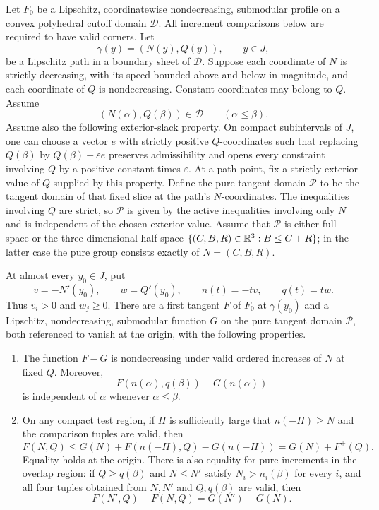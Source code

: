 \begin{lemma}\label{ent:signed-envelope}
Let $F_0$ be a Lipschitz, coordinatewise nondecreasing, submodular
profile on a convex polyhedral cutoff domain $\mathcal D$.  All
increment comparisons below are required to have valid corners.
Let
\[
\gamma(y)=(N(y),Q(y)),\qquad y\in J,
\]
be a Lipschitz path in a boundary sheet of $\mathcal D$.  Suppose
each coordinate of $N$ is strictly decreasing, with its speed
bounded above and below in magnitude, and each coordinate of $Q$
is nondecreasing.  Constant coordinates may belong to $Q$.
Assume
\[
(N(\alpha),Q(\beta))\in\mathcal D\qquad(\alpha\leq\beta).
\]
Assume also the following exterior-slack property.  On compact
subintervals of $J$, one can choose a vector $e$ with strictly
positive $Q$-coordinates such that replacing $Q(\beta)$ by
$Q(\beta)+\varepsilon e$ preserves admissibility and opens every
constraint involving $Q$ by a positive constant times
$\varepsilon$.  At a path point, fix a strictly exterior value
of $Q$ supplied by this property.  Define the pure tangent
domain $\mathcal P$ to be the tangent domain of that fixed
slice at the path's $N$-coordinates.  The inequalities involving
$Q$ are strict, so $\mathcal P$ is given by the active
inequalities involving only $N$ and is independent of the chosen
exterior value.  Assume that $\mathcal P$ is either full space or
the three-dimensional half-space
$\{(C,B,R)\in\mathbb R^3:B\leq C+R\}$; in the latter case the pure
group consists exactly of $N=(C,B,R)$.

At almost every $y_0\in J$, put
\[
v=-N'(y_0),\qquad w=Q'(y_0),\qquad
n(t)=-tv,\qquad q(t)=tw.
\]
Thus $v_i>0$ and $w_j\geq0$.  There are a first tangent $F$ of
$F_0$ at $\gamma(y_0)$ and a Lipschitz, nondecreasing,
submodular function $G$ on the pure tangent domain $\mathcal P$,
both referenced to vanish at the origin, with the following
properties.
\begin{enumerate}[label=\textup{(\roman*)}]
\item
The function $F-G$ is nondecreasing under valid ordered increases
of $N$ at fixed $Q$.  Moreover,
\[
F(n(\alpha),q(\beta))-G(n(\alpha))
\]
is independent of $\alpha$ whenever $\alpha\leq\beta$.

\item
On any compact test region, if $H$ is sufficiently large that
$n(-H)\geq N$ and the comparison tuples are valid, then
\begin{equation}\label{eq:source-14}
F(N,Q)\leq
G(N)+F(n(-H),Q)-G(n(-H))
=G(N)+F^+(Q).
\end{equation}
Equality holds at the origin.  There is also equality for pure
increments in the overlap region: if $Q\geq q(\beta)$ and
$N\leq N'$ satisfy $N_i>n_i(\beta)$ for every $i$, and all four
tuples obtained from $N,N'$ and $Q,q(\beta)$ are valid, then
\[
F(N',Q)-F(N,Q)=G(N')-G(N).
\]


\end{enumerate}
\end{lemma}
